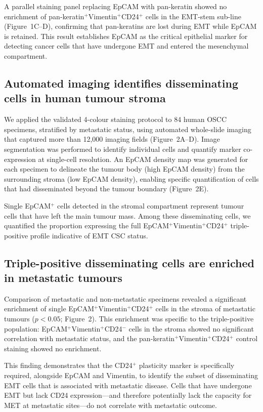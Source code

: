 \documentclass[11pt]{article}
\begin{document}
A parallel staining panel replacing EpCAM with pan-keratin showed no enrichment of pan-keratin$^{+}$Vimentin$^{+}$CD24$^{+}$ cells in the EMT-stem sub-line (Figure~1C--D), confirming that pan-keratins are lost during EMT while EpCAM is retained. This result establishes EpCAM as the critical epithelial marker for detecting cancer cells that have undergone EMT and entered the mesenchymal compartment.

\subsection{Automated imaging identifies disseminating cells in human tumour stroma}

We applied the validated 4-colour staining protocol to 84 human OSCC specimens, stratified by metastatic status, using automated whole-slide imaging that captured more than 12,000 imaging fields (Figure~2A--D). Image segmentation was performed to identify individual cells and quantify marker co-expression at single-cell resolution. An EpCAM density map was generated for each specimen to delineate the tumour body (high EpCAM density) from the surrounding stroma (low EpCAM density), enabling specific quantification of cells that had disseminated beyond the tumour boundary (Figure~2E).

Single EpCAM$^{+}$ cells detected in the stromal compartment represent tumour cells that have left the main tumour mass. Among these disseminating cells, we quantified the proportion expressing the full EpCAM$^{+}$Vimentin$^{+}$CD24$^{+}$ triple-positive profile indicative of EMT CSC status.

\subsection{Triple-positive disseminating cells are enriched in metastatic tumours}

Comparison of metastatic and non-metastatic specimens revealed a significant enrichment of single EpCAM$^{+}$Vimentin$^{+}$CD24$^{+}$ cells in the stroma of metastatic tumours ($p < 0.05$; Figure~2). This enrichment was specific to the triple-positive population: EpCAM$^{+}$Vimentin$^{+}$CD24$^{-}$ cells in the stroma showed no significant correlation with metastatic status, and the pan-keratin$^{+}$Vimentin$^{+}$CD24$^{+}$ control staining showed no enrichment.

This finding demonstrates that the CD24$^{+}$ plasticity marker is specifically required, alongside EpCAM and Vimentin, to identify the subset of disseminating EMT cells that is associated with metastatic disease. Cells that have undergone EMT but lack CD24 expression---and therefore potentially lack the capacity for MET at metastatic sites---do not correlate with metastatic outcome.
\end{document}
